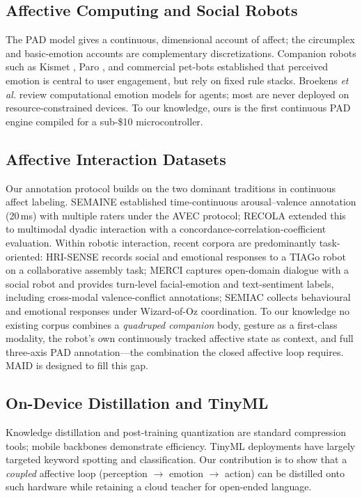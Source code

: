 \documentclass{article}
\theoremstyle{definition}
\begin{document}
\subsection{Affective Computing and Social Robots}
The PAD model \cite{mehrabian1996pad} gives a continuous, dimensional account of
affect; the circumplex \cite{russell1980circumplex} and basic-emotion accounts
\cite{ekman1992argument} are complementary discretizations. Companion robots such
as Kismet \cite{breazeal2003emotion}, Paro \cite{shibata2004paro}, and commercial
pet-bots \cite{breazeal2003designing} established that perceived emotion is
central to user engagement, but rely on fixed rule stacks. Broekens \emph{et al.}
\cite{broekens2013challenges} review computational emotion models for agents;
most are never deployed on resource-constrained devices. To our knowledge, ours
is the first continuous PAD engine compiled for a sub-\$10 microcontroller.

\subsection{Affective Interaction Datasets}
Our annotation protocol builds on the two dominant traditions in continuous
affect labeling. SEMAINE \cite{semaine2012} established time-continuous
arousal--valence annotation (20\,ms) with multiple raters under the AVEC
protocol; RECOLA \cite{recola2013} extended this to multimodal dyadic
interaction with a concordance-correlation-coefficient evaluation. Within
robotic interaction, recent corpora are predominantly task-oriented:
HRI-SENSE \cite{hrisense2025} records social and emotional responses to a
TIAGo robot on a collaborative assembly task; MERCI \cite{merci2025} captures
open-domain dialogue with a social robot and provides turn-level facial-emotion
and text-sentiment labels, including cross-modal valence-conflict annotations;
SEMIAC \cite{semiac2025} collects behavioural and emotional responses under
Wizard-of-Oz coordination. To our knowledge no existing corpus combines a
\emph{quadruped companion} body, gesture as a first-class modality, the
robot's own continuously tracked affective state as context, and full
three-axis PAD annotation---the combination the closed affective loop requires.
MAID is designed to fill this gap.

\subsection{On-Device Distillation and TinyML}
Knowledge distillation \cite{hinton2015distilling} and post-training
quantization \cite{jacob2018quantization} are standard compression tools; mobile
backbones \cite{howard2017mobilenets} demonstrate efficiency. TinyML deployments
have largely targeted keyword spotting and classification. Our contribution is
to show that a \emph{coupled} affective loop (perception $\rightarrow$ emotion
$\rightarrow$ action) can be distilled onto such hardware while retaining a
cloud teacher for open-ended language.
\end{document}
